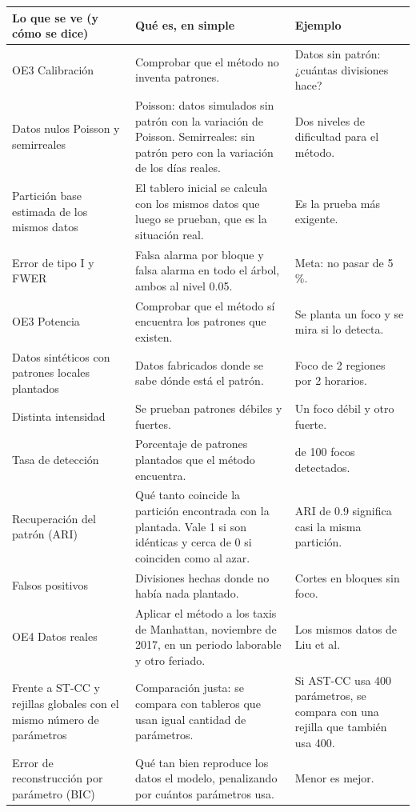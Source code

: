 \documentclass[11pt,a4paper]{article}
\makeatletter
\newenvironment{partes}{%
  \begin{longtable}{@{}>{\raggedright\arraybackslash}p{4.3cm}>{\raggedright\arraybackslash}p{6.0cm}>{\raggedright\arraybackslash}p{5.0cm}@{}}
  \toprule \textbf{Lo que se ve (y cómo se dice)} & \textbf{Qué es, en simple} & \textbf{Ejemplo}\\ \midrule \endhead}{%
  \bottomrule\end{longtable}}
\newcommand{\se}[1]{\newline{\small\color{ucspblue}(se dice «#1»)}}
\makeatother
\begin{document}
\begin{partes}
OE3 Calibración \se{o e tres, calibración} & Comprobar que el método no inventa patrones. & Datos sin patrón: ¿cuántas divisiones hace? \\
Datos nulos Poisson y semirreales & Poisson: datos simulados sin patrón con la variación de Poisson. Semirreales: sin patrón pero con la variación de los días reales. & Dos niveles de dificultad para el método. \\
Partición base estimada de los mismos datos & El tablero inicial se calcula con los mismos datos que luego se prueban, que es la situación real. & Es la prueba más exigente. \\
Error de tipo I y FWER \se{error de tipo uno y efe-doble u-e-erre} & Falsa alarma por bloque y falsa alarma en todo el árbol, ambos al nivel 0.05. & Meta: no pasar de 5\,\%. \\
OE3 Potencia \se{o e tres, potencia} & Comprobar que el método sí encuentra los patrones que existen. & Se planta un foco y se mira si lo detecta. \\
Datos sintéticos con patrones locales plantados & Datos fabricados donde se sabe dónde está el patrón. & Foco de 2 regiones por 2 horarios. \\
Distinta intensidad & Se prueban patrones débiles y fuertes. & Un foco débil y otro fuerte. \\
Tasa de detección & Porcentaje de patrones plantados que el método encuentra. & 90 de 100 focos detectados. \\
Recuperación del patrón (ARI) \se{a erre i} & Qué tanto coincide la partición encontrada con la plantada. Vale 1 si son idénticas y cerca de 0 si coinciden como al azar. & ARI de 0.9 significa casi la misma partición. \\
Falsos positivos & Divisiones hechas donde no había nada plantado. & Cortes en bloques sin foco. \\
OE4 Datos reales & Aplicar el método a los taxis de Manhattan, noviembre de 2017, en un periodo laborable y otro feriado. & Los mismos datos de Liu et al. \\
Frente a ST-CC y rejillas globales con el mismo número de parámetros & Comparación justa: se compara con tableros que usan igual cantidad de parámetros. & Si AST-CC usa 400 parámetros, se compara con una rejilla que también usa 400. \\
Error de reconstrucción por parámetro (BIC) \se{bic} & Qué tan bien reproduce los datos el modelo, penalizando por cuántos parámetros usa. & Menor es mejor. \\

\end{partes}
\end{document}
